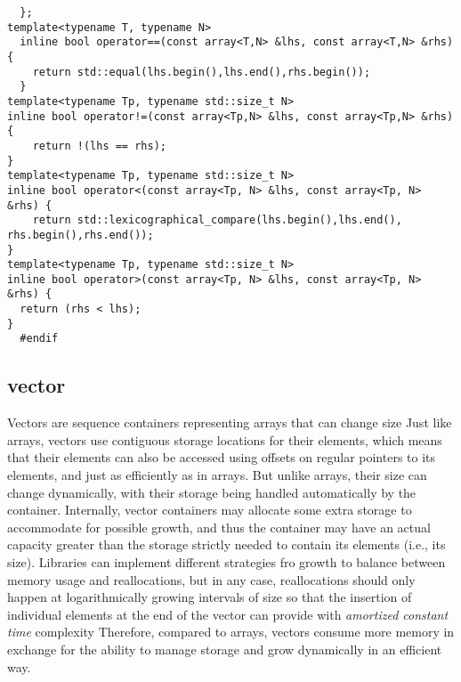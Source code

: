 \documentclass{report}
\begin{document}
\begin{verbatim}
  };
template<typename T, typename N>
  inline bool operator==(const array<T,N> &lhs, const array<T,N> &rhs) {
    return std::equal(lhs.begin(),lhs.end(),rhs.begin());
  }
template<typename Tp, typename std::size_t N>
inline bool operator!=(const array<Tp,N> &lhs, const array<Tp,N> &rhs) {
    return !(lhs == rhs);
}
template<typename Tp, typename std::size_t N>
inline bool operator<(const array<Tp, N> &lhs, const array<Tp, N> &rhs) {
    return std::lexicographical_compare(lhs.begin(),lhs.end(), rhs.begin(),rhs.end());
}
template<typename Tp, typename std::size_t N>
inline bool operator>(const array<Tp, N> &lhs, const array<Tp, N> &rhs) {
  return (rhs < lhs);
}
  #endif

  \end{verbatim}
  \subsection{vector}
Vectors are sequence containers representing arrays that can change size
\bigbreak \noindent
Just like arrays, vectors use contiguous storage locations for their elements, which means that their elements can also be accessed using offsets on regular pointers to its elements, and just as efficiently as in arrays. But unlike arrays, their size can change dynamically, with their storage being handled automatically by the container.
\bigbreak \noindent
Internally, vector containers may allocate some extra storage to accommodate for possible growth, and thus the container may have an actual capacity greater than the storage strictly needed to contain its elements (i.e., its size). Libraries can implement different strategies fro growth to balance between memory usage and reallocations, but in any case, reallocations should only happen at logarithmically growing intervals of size so that the insertion of individual elements at the end of the vector can provide with \textit{amortized constant time} complexity
\bigbreak \noindent
Therefore, compared to arrays, vectors consume more memory in exchange for the ability to manage storage and grow dynamically in an efficient way.
\end{document}
